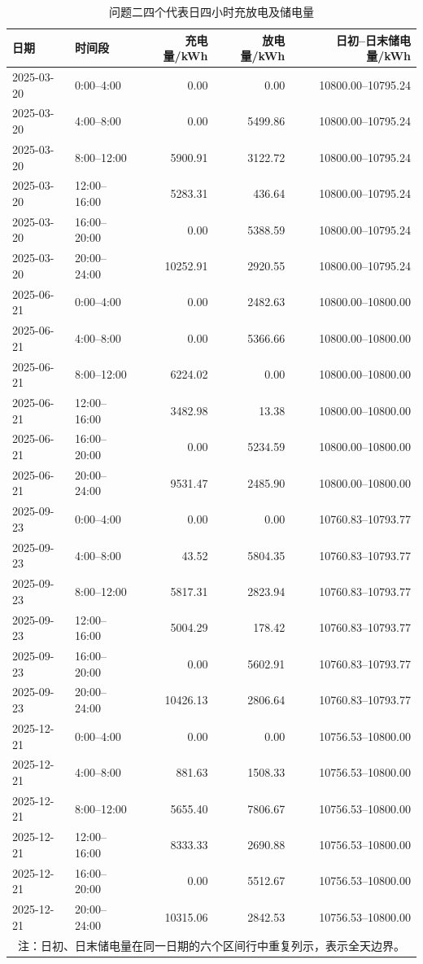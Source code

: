 \documentclass[UTF8,12pt,a4paper]{ctexart}
\theoremstyle{remark}
\begin{document}
\begin{table}[H]\centering\scriptsize
\caption{问题二四个代表日四小时充放电及储电量}\label{tab:q2-blocks}
\begin{tabular}{llrrr}\toprule 日期&时间段&充电量/kWh&放电量/kWh&日初--日末储电量/kWh\\\midrule
2025-03-20&0:00--4:00&0.00&0.00&10800.00--10795.24\\
2025-03-20&4:00--8:00&0.00&5499.86&10800.00--10795.24\\
2025-03-20&8:00--12:00&5900.91&3122.72&10800.00--10795.24\\
2025-03-20&12:00--16:00&5283.31&436.64&10800.00--10795.24\\
2025-03-20&16:00--20:00&0.00&5388.59&10800.00--10795.24\\
2025-03-20&20:00--24:00&10252.91&2920.55&10800.00--10795.24\\
2025-06-21&0:00--4:00&0.00&2482.63&10800.00--10800.00\\
2025-06-21&4:00--8:00&0.00&5366.66&10800.00--10800.00\\
2025-06-21&8:00--12:00&6224.02&0.00&10800.00--10800.00\\
2025-06-21&12:00--16:00&3482.98&13.38&10800.00--10800.00\\
2025-06-21&16:00--20:00&0.00&5234.59&10800.00--10800.00\\
2025-06-21&20:00--24:00&9531.47&2485.90&10800.00--10800.00\\
2025-09-23&0:00--4:00&0.00&0.00&10760.83--10793.77\\
2025-09-23&4:00--8:00&43.52&5804.35&10760.83--10793.77\\
2025-09-23&8:00--12:00&5817.31&2823.94&10760.83--10793.77\\
2025-09-23&12:00--16:00&5004.29&178.42&10760.83--10793.77\\
2025-09-23&16:00--20:00&0.00&5602.91&10760.83--10793.77\\
2025-09-23&20:00--24:00&10426.13&2806.64&10760.83--10793.77\\
2025-12-21&0:00--4:00&0.00&0.00&10756.53--10800.00\\
2025-12-21&4:00--8:00&881.63&1508.33&10756.53--10800.00\\
2025-12-21&8:00--12:00&5655.40&7806.67&10756.53--10800.00\\
2025-12-21&12:00--16:00&8333.33&2690.88&10756.53--10800.00\\
2025-12-21&16:00--20:00&0.00&5512.67&10756.53--10800.00\\
2025-12-21&20:00--24:00&10315.06&2842.53&10756.53--10800.00\\\bottomrule
\multicolumn{5}{c}{注：日初、日末储电量在同一日期的六个区间行中重复列示，表示全天边界。}\end{tabular}\end{table}
\end{document}
